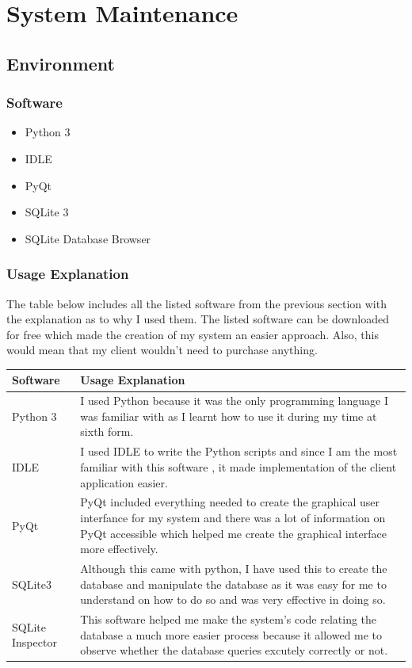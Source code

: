 \chapter{System Maintenance}

\section{Environment}

\subsection{Software}

\begin {itemize}
	\item Python 3
	\item IDLE
	\item PyQt
	\item SQLite 3
	\item SQLite Database Browser
	
\end {itemize}

\subsection{Usage Explanation}


The table below includes all the listed software from the previous section with the explanation as to why I used them.
The listed software can be downloaded for free which made the creation of my system an easier approach. Also, this would mean that my client wouldn't need to purchase anything.

\begin{center}
\begin{tabular}{|p{4cm}|p{8.5cm}|}
\hline
\textbf{Software} & \textbf{Usage Explanation} \\ \hline

Python 3 & I used Python because it was the only programming language I was familiar with as I learnt how to use it during my time at sixth form. \\ \hline
IDLE & I used IDLE to write the Python scripts and since I am the most familiar with this software , it made implementation of the client application easier. \\ \hline
PyQt& PyQt included everything needed to create the graphical user interfance for my system and there was a lot of information on PyQt accessible which helped me create the graphical interface more effectively. \\ \hline
SQLite3 & Although this came with python, I have used this to create the database and manipulate the database as it was  easy for me to understand on how to do so and was very effective in doing so. \\ \hline
SQLite Inspector & This software helped me make the system's code relating the database a much more easier process because it allowed me to observe whether the database queries excutely correctly or not. \\ \hline

\end{tabular}
\end{center}
